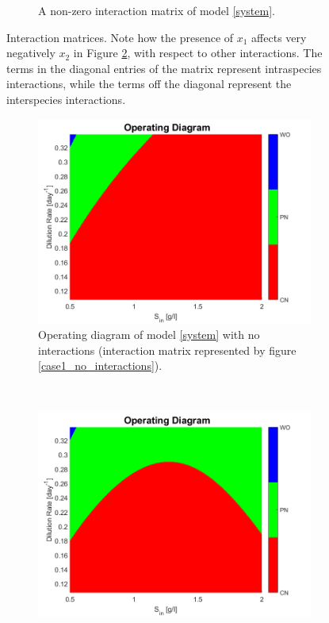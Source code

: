 \documentclass[processes,article,submit,moreauthors,pdftex]{Definitions/mdpi}
\begin{document}
\begin{figure}[h]
\begin{subfigure}[b]{0.45\textwidth}
		\caption{A non-zero interaction matrix of model \eqref{system}.}
		\label{case1_interactions}
	\end{subfigure}
	\caption{Interaction matrices. Note how the presence of $x_1$ affects very negatively $x_2$ in Figure \ref{case1_interactions}, with respect to other interactions. The terms in the diagonal entries of the matrix represent intraspecies interactions, while the terms off the diagonal represent the interspecies interactions.}
\end{figure} 

\begin{figure}[h]
	\centering
	\begin{subfigure}[t]{0.45\textwidth}
		\includegraphics[width = \textwidth]{Stability/OD_case_study_1_no_interactions}
		\caption{Operating diagram of model \eqref{system} with no interactions (interaction matrix represented by figure \ref{case1_no_interactions}).}
		\label{OD_no_interactions}
	\end{subfigure}
	~
	\begin{subfigure}[t]{0.45\textwidth}
		\includegraphics[width = \textwidth]{Stability/OD_case_study_1}

\end{subfigure}
\end{figure}
\end{document}
